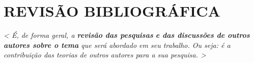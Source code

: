 \chapter{REVISÃO BIBLIOGRÁFICA}
\label{cap1Revisao}
\textit{< É, de forma geral, a \textbf{revisão das pesquisas} \textbf{e das discussões de outros autores sobre o tema} que será abordado em seu trabalho. Ou seja: é a contribuição das teorias de outros autores para a sua pesquisa. >}

